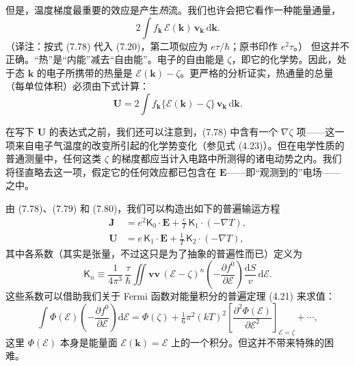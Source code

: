 但是，温度梯度最重要的效应是产生\emph{热}流。我们也许会把它看作一种能量通量，
\begin{equation*}
2\int f_{\mathbf{k}}\,\mathcal{E}(\mathbf{k})\,\mathbf{v}_{\mathbf{k}}\,\mathrm{d}\mathbf{k}.
\end{equation*}
（译注：按式 (7.78) 代入 (7.20)，第二项似应为 $e\tau/\hbar$；原书印作 $e^{2}\tau$。）
但这并不正确。“热”是“内能”减去“自由能”。电子的自由能是 $\zeta$，即它的化学势。因此，处于态 $\mathbf{k}$ 的电子所携带的热量是 $\mathcal{E}(\mathbf{k})-\zeta$。更严格的分析证实，热通量的总量（每单位体积）必须由下式计算：
\begin{equation*}
\mathbf{U}=2\int f_{\mathbf{k}}\{\mathcal{E}(\mathbf{k})-\zeta\}\,\mathbf{v}_{\mathbf{k}}\,\mathrm{d}\mathbf{k}.\tag{7.80}
\end{equation*}

在写下 $\mathbf{U}$ 的表达式之前，我们还可以注意到，(7.78) 中含有一个 $\nabla\zeta$ 项——这一项来自电子气温度的改变所引起的化学势变化（参见式 (4.23)）。但在电学性质的普通测量中，任何这类 $\zeta$ 的梯度都应当计入电路中所测得的诸电动势之内。我们将径直略去这一项，假定它的任何效应都已包含在 $\mathbf{E}$——即“观测到的”电场——之中。

由 (7.78)、(7.79) 和 (7.80)，我们可以构造出如下的普遍输运方程
\begin{align*}
\mathbf{J}&=e^{2}\mathsf{K}_{0}\cdot\mathbf{E}+\frac{e}{T}\,\mathsf{K}_{1}\cdot(-\nabla T),\tag{7.81a}\\
\mathbf{U}&=e\,\mathsf{K}_{1}\cdot\mathbf{E}+\frac{1}{T}\,\mathsf{K}_{2}\cdot(-\nabla T),\tag{7.81b}
\end{align*}
其中各系数（其实是张量，不过这只是为了抽象的普遍性而已）定义为
\begin{equation*}
\mathsf{K}_{n}\equiv\frac{1}{4\pi^{3}}\,\frac{\tau}{\hbar}\iint\mathbf{v}\mathbf{v}\,(\mathcal{E}-\zeta)^{n}\left(-\frac{\partial f^{0}}{\partial\mathcal{E}}\right)\frac{\mathrm{d}S}{v}\,\mathrm{d}\mathcal{E}.\tag{7.82}
\end{equation*}
这些系数可以借助我们关于 Fermi 函数对能量积分的普遍定理 (4.21) 来求值：
\begin{equation*}
\int\Phi(\mathcal{E})\left(-\frac{\partial f^{0}}{\partial\mathcal{E}}\right)\mathrm{d}\mathcal{E}=\Phi(\zeta)+\tfrac{1}{6}\pi^{2}(kT)^{2}\left[\frac{\partial^{2}\Phi(\mathcal{E})}{\partial\mathcal{E}^{2}}\right]_{\mathcal{E}=\zeta}+\cdots,\tag{7.83}
\end{equation*}
这里 $\Phi(\mathcal{E})$ 本身是能量面 $\mathcal{E}(\mathbf{k})=\mathcal{E}$ 上的一个积分。但这并不带来特殊的困难。

